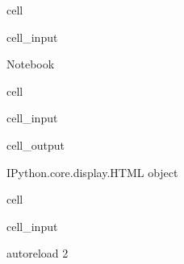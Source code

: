 \documentclass[letterpaper,10pt,english]{jupyterBook}
\begin{document}
\begin{sphinxuseclass}{cell}\begin{sphinxVerbatimInput}

\begin{sphinxuseclass}{cell_input}
\begin{sphinxVerbatim}[commandchars=\\\{\}]
 Notebook
\end{sphinxVerbatim}

\end{sphinxuseclass}\end{sphinxVerbatimInput}

\end{sphinxuseclass}
\begin{sphinxuseclass}{cell}\begin{sphinxVerbatimInput}

\begin{sphinxuseclass}{cell_input}
\begin{sphinxVerbatim}[commandchars=\\\{\}]
   

    
   
\end{sphinxVerbatim}

\end{sphinxuseclass}\end{sphinxVerbatimInput}
\begin{sphinxVerbatimOutput}

\begin{sphinxuseclass}{cell_output}
\begin{sphinxVerbatim}[commandchars=\\\{\}]
\PYGZlt{}IPython.core.display.HTML object\PYGZgt{}
\end{sphinxVerbatim}

\end{sphinxuseclass}\end{sphinxVerbatimOutput}

\end{sphinxuseclass}
\begin{sphinxuseclass}{cell}\begin{sphinxVerbatimInput}

\begin{sphinxuseclass}{cell_input}
\begin{sphinxVerbatim}[commandchars=\\\{\}]
  autoreload
  2
\end{sphinxVerbatim}

\end{sphinxuseclass}\end{sphinxVerbatimInput}

\end{sphinxuseclass}
\end{document}
